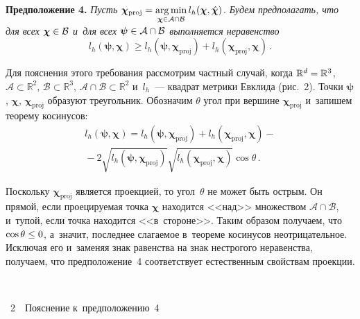 \begin{multicols}{2}
\noindent
\textbf{Предположение 4.} %
\textit{Пусть $\boldsymbol{\chi}_{\mathrm{proj}} \hm=
\argmin\limits_{\boldsymbol{\chi} \in \mathcal{A} \cap \mathcal{B}}
l_h(\boldsymbol{\chi}, \hchi)$. Будем предполагать, что для всех
$\boldsymbol{\chi} \hm\in \mathcal{B}$ и~для всех $\boldsymbol{\psi} \hm\in \mathcal{A}
\cap \mathcal{B}$ выполняется неравенство}
$$
    l_h(\boldsymbol{\psi}, \boldsymbol{\chi}) \geq
    l_h(\boldsymbol{\psi}, \boldsymbol{\chi}_{\mathrm{proj}}) +
    l_h(\boldsymbol{\chi}_{\mathrm{proj}},
    \boldsymbol{\chi})\,.
$$

\smallskip

Для пояснения этого требования рассмотрим частный случай, когда
$\mathbb{R}^d \hm= \mathbb{R}^3$, $\mathcal{A} \subset \mathbb{R}^2$, $\mathcal{B} \subset \mathbb{R}^3$, $\mathcal{A} \cap \mathcal{B}
\subset \mathbb{R}^2$ и~$l_h$~--- квадрат метрики Евклида
(рис.~2). Точки
$\boldsymbol{\psi}$, $\boldsymbol{\chi}$,
$\boldsymbol{\chi}_{\mathrm{proj}}$ образуют треугольник. Обозначим
$\theta$ угол при вершине $\boldsymbol{\chi}_{\mathrm{proj}}$ и~запишем
теорему косинусов:
\begin{multline*}
    l_h(\boldsymbol{\psi}, \boldsymbol{\chi}) =
    l_h(\boldsymbol{\psi}, \boldsymbol{\chi}_{\mathrm{proj}}) +
    l_h(\boldsymbol{\chi}_{\mathrm{proj}},
    \boldsymbol{\chi}) - {}\\
    {}-2 \sqrt{l_h(\boldsymbol{\psi}, \boldsymbol{\chi}_{\mathrm{proj}})}
    \sqrt{l_h(\boldsymbol{\chi}_{\mathrm{proj}},
    \boldsymbol{\chi})} \cos \theta\,.
\end{multline*}


Поскольку $\boldsymbol{\chi}_{\mathrm{proj}}$ является проекцией, то
угол~$\theta$ не может быть острым. Он прямой, если проецируемая точка
$\boldsymbol{\chi}$ находится <<над>> множеством $\mathcal{A} \cap \mathcal{B}$, и~тупой, если точка находится <<в~стороне>>. Таким образом получаем,
что $\cos \theta \hm\leq 0$, а~значит, последнее слагаемое в~теореме
косинусов неотрицательное. Исключая его и~заменяя знак равенства
на знак нестрогого неравенства, получаем, что предположение~4
соответствует естественным свойствам проекции.

\begin{center}  %
\vspace*{-1pt}
\mbox{%
 \epsfxsize=69.331mm
 }


\vspace*{3pt}

{{\figurename~2}\ \ \small{Пояснение к~предположению~4}}


\end{center}
\end{multicols}
